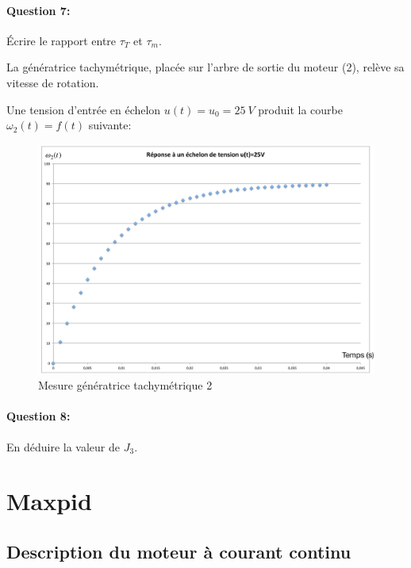 \paragraph{Question 7:} Écrire le rapport entre $\tau_T$ et $\tau_m$.

La génératrice tachymétrique, placée sur l'arbre de sortie du moteur (2), relève sa vitesse de rotation.

Une tension d'entrée en échelon $u(t)=u_0=25\ V$ produit la courbe $\omega_2(t)=f(t)$ suivante:

\begin{figure}[!h]
 \centering\includegraphics[width=0.8\linewidth]{img/fig_moteur_charge_03}
  \caption{Mesure génératrice tachymétrique 2}
 \label{fig_moteur_charge_03}
\end{figure}

\paragraph{Question 8:} En déduire la valeur de $J_3$.

\newpage

\section{Maxpid}

\subsection{Description du moteur à courant continu}

